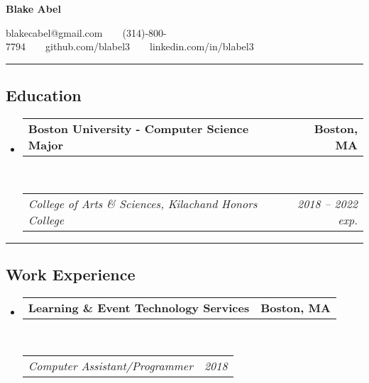 \documentclass[11pt,letterpaper]{article}
\makeatletter
\newcommand{\headerrow}[2]
{\begin{tabular*}{\linewidth}{l@{\extracolsep{\fill}}r}
	#1 &
	#2 \\
\end{tabular*}}
\makeatother
\begin{document}
\begin{center}
{\LARGE \textbf{Blake Abel}}

blakecabel@gmail.com\ \ \textbullet \ \ (314)-800-7794\ \ \textbullet \ \ github.com/blabel3\ \ \textbullet \ \ linkedin.com/in/blabel3

\end{center}

\hrule
\vspace{-0.4em}
\subsection*{Education}

\begin{itemize}
	\parskip=0.1em

	\item 
	\headerrow
		{\textbf{Boston University - Computer Science Major}}
		{\textbf{Boston, MA}}
	\\
	\headerrow
		{\emph{College of Arts \& Sciences, Kilachand Honors College}}
		{\emph{2018 -- 2022 exp.}}
	

\end{itemize}

\hrule
\vspace{-0.4em}
\subsection*{Work Experience}

\begin{itemize}
	\parskip=0.1em

	\item
	\headerrow
		{\textbf{Learning \& Event Technology Services}}
		{\textbf{Boston, MA}}
	\\
	\headerrow
		{\emph{Computer Assistant/Programmer}}
		{\emph{2018}}

\end{itemize}
\end{document}
